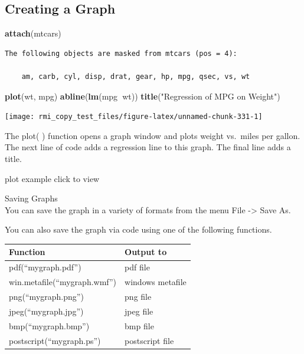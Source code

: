 \documentclass[]{book}
\newenvironment{Shaded}{\begin{snugshade}}{\end{snugshade}}
\newcommand{\KeywordTok}[1]{\textcolor[rgb]{0.13,0.29,0.53}{\textbf{#1}}}
\newcommand{\NormalTok}[1]{#1}
\newcommand{\OperatorTok}[1]{\textcolor[rgb]{0.81,0.36,0.00}{\textbf{#1}}}
\newcommand{\StringTok}[1]{\textcolor[rgb]{0.31,0.60,0.02}{#1}}
\theoremstyle{definition}
\theoremstyle{definition}
\theoremstyle{definition}
\theoremstyle{remark}
\begin{document}
\hypertarget{creating-a-graph}{%
\subsection{Creating a Graph}\label{creating-a-graph}}

\begin{Shaded}
\begin{Highlighting}[]
\KeywordTok{attach}\NormalTok{(mtcars)}
\end{Highlighting}
\end{Shaded}

\begin{verbatim}
The following objects are masked from mtcars (pos = 4):

    am, carb, cyl, disp, drat, gear, hp, mpg, qsec, vs, wt
\end{verbatim}

\begin{Shaded}
\begin{Highlighting}[]
\KeywordTok{plot}\NormalTok{(wt, mpg) }
\KeywordTok{abline}\NormalTok{(}\KeywordTok{lm}\NormalTok{(mpg}\OperatorTok{~}\NormalTok{wt))}
\KeywordTok{title}\NormalTok{(}\StringTok{"Regression of MPG on Weight"}\NormalTok{)}
\end{Highlighting}
\end{Shaded}

\begin{center}\texttt{[image: rmi\_copy\_test\_files/figure-latex/unnamed-chunk-331-1]} \end{center}

The plot( ) function opens a graph window and plots weight vs.~miles per
gallon. The next line of code adds a regression line to this graph. The
final line adds a title.

plot example click to view

Saving Graphs\\
You can save the graph in a variety of formats from the menu File
-\textgreater{} Save As.

You can also save the graph via code using one of the following
functions.

\begin{longtable}[]{@{}ll@{}}
\toprule
Function & Output to\tabularnewline
\midrule
\endhead
pdf(``mygraph.pdf'') & pdf file\tabularnewline
win.metafile(``mygraph.wmf'') & windows metafile\tabularnewline
png(``mygraph.png'') & png file\tabularnewline
jpeg(``mygraph.jpg'') & jpeg file\tabularnewline
bmp(``mygraph.bmp'') & bmp file\tabularnewline
postscript(``mygraph.ps'') & postscript file\tabularnewline
\bottomrule
\end{longtable}
\end{document}
